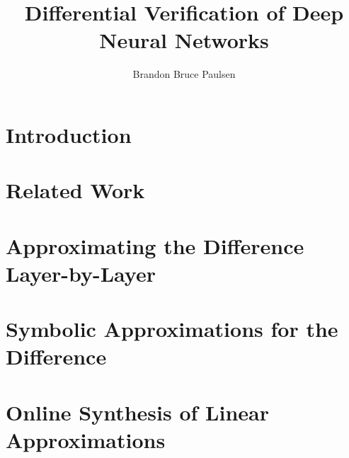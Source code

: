 \documentclass[11pt]{report}
\begin{document}
\title{Differential Verification of Deep Neural Networks}

\author{Brandon Bruce Paulsen}



\begin{preface}
%  

  

  {
  \hypersetup{hidelinks} %
  \tableofcontents
  \listoftables
  \listoffigures
  }

  
\end{preface}

\chapter{Introduction}
  \label{ch:introduction}

\graphicspath{}


\chapter{Related Work}
\label{ch:background}


\chapter{Approximating the Difference Layer-by-Layer}
\label{ch:reludiff}



\chapter{Symbolic Approximations for the Difference}
\label{ch:neurodiff}


\chapter{Online Synthesis of Linear Approximations}
\label{ch:onlinesyn}

\end{document}
